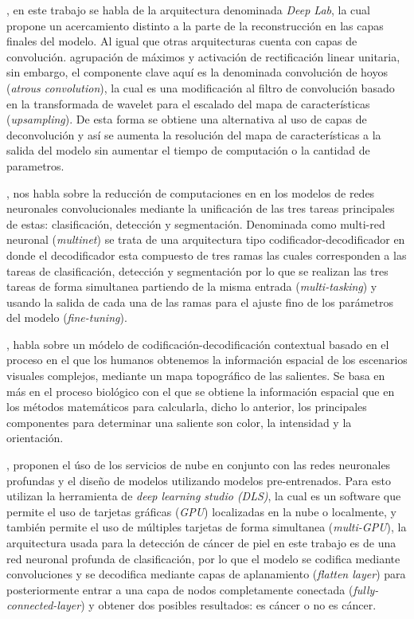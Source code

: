 \citet{DBLP:journals/corr/ChenPK0Y16}, en este trabajo se habla de la arquitectura denominada \emph{Deep Lab}, la cual propone un acercamiento distinto a la parte de la reconstrucción en las capas finales del modelo. Al igual que otras arquitecturas cuenta con capas de convolución. agrupación de máximos y activación de rectificación linear unitaria, sin embargo, el componente clave aquí es la denominada convolución de hoyos (\emph{atrous convolution}), la cual es una modificación al filtro de convolución basado en la transformada de wavelet para el escalado del mapa de características (\emph{upsampling}). De esta forma se obtiene una alternativa al uso de capas de deconvolución y así se aumenta la resolución del mapa de características a la salida del modelo sin aumentar el tiempo de computación o la cantidad de parametros.

\citet{DBLP:journals/corr/TeichmannWZCU16}, nos habla sobre la reducción de computaciones en en los modelos de redes neuronales convolucionales mediante la unificación de las tres tareas principales de estas: clasificación, detección y segmentación. Denominada como multi-red neuronal (\emph{multinet}) se trata de una arquitectura tipo codificador-decodificador en donde el decodificador esta compuesto de tres ramas las cuales corresponden a las tareas de clasificación, detección y segmentación por lo que se realizan las tres tareas de forma simultanea partiendo de la misma entrada (\emph{multi-tasking}) y usando la salida de cada una de las ramas para el ajuste fino de los parámetros del modelo (\emph{fine-tuning}).  

\citet{KRONER2020261}, habla sobre un módelo de codificación-decodificación contextual basado en el proceso en el que los humanos obtenemos la información espacial de los escenarios visuales complejos, mediante un mapa topográfico de las salientes. Se basa en más en el proceso biológico con el que se obtiene la información espacial que en los métodos matemáticos para calcularla, dicho lo anterior, los principales componentes para determinar una saliente son color, la intensidad y la orientación.  

\citet{KADAMPUR2020100282}, proponen el úso de los servicios de nube en conjunto con las redes neuronales profundas y el diseño de modelos utilizando modelos pre-entrenados. Para esto utilizan la herramienta de \emph{deep learning studio (DLS)}, la cual es un software que permite el uso de tarjetas gráficas (\emph{GPU}) localizadas en la nube o localmente, y también permite el uso de múltiples tarjetas de forma simultanea (\emph{multi-GPU}), la arquitectura usada para la detección de cáncer de piel en este trabajo es de una red neuronal profunda de clasificación, por lo que el modelo se codifica mediante convoluciones y se decodifica mediante capas de aplanamiento (\emph{flatten layer}) para posteriormente entrar a una capa de nodos completamente conectada (\emph{fully-connected-layer}) y obtener dos posibles resultados: es cáncer o no es cáncer.

